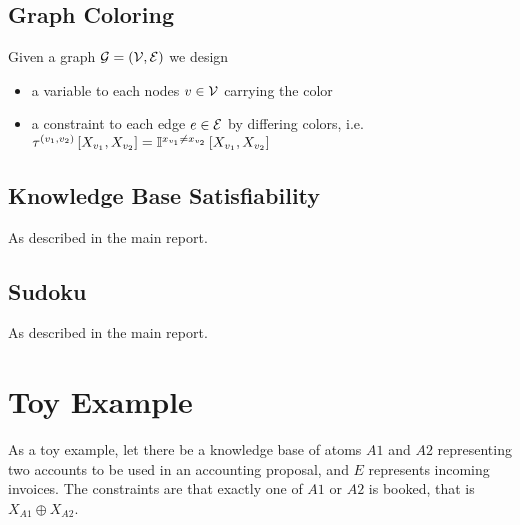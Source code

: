 \documentclass[aps,onecolumn,nofootinbib,pra]{article}
\begin{document}
    \subsection{Graph Coloring}

    Given a graph $\mathcal{G}=(\mathcal{V},\mathcal{E})$ we design
    \begin{itemize}
        \item a variable to each nodes $v\in\mathcal{V}$ carrying the color
        \item a constraint to each edge $e\in\mathcal{E}$ by differing colors, i.e. $\tau^{(v_1,v_2)}\left[X_{v_1},X_{v_2}\right] = \mathbb{I}^{x_{v_1}\neq x_{v_2}}\left[X_{v_1},X_{v_2}\right] $
    \end{itemize}

    \subsection{Knowledge Base Satisfiability}

    As described in the main report.

    \subsection{Sudoku}

    As described in the main report.


    \section{Toy Example}

    As a toy example, let there be a knowledge base of atoms $A1$ and $A2$ representing two accounts to be used in an accounting proposal, and $E$ represents incoming invoices.
    The constraints are that exactly one of $A1$ or $A2$ is booked, that is $X_{A1}\oplus X_{A2}$.
\end{document}
